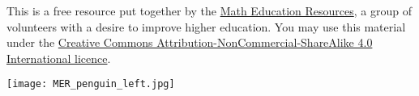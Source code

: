 \vfill

\begin{multicols}{2}
\hfill \begin{minipage}{0.45\textwidth}This is a free resource put together by the \href{http://www.math-education-resources.com}{Math Education Resources}, a group of volunteers with a desire to improve higher education. You may use this material under the \href{https://creativecommons.org/licenses/by-nc-sa/4.0/}{Creative Commons Attribution-NonCommercial-ShareAlike 4.0 International licence}.

\end{minipage}

\columnbreak

\begin{center}
\texttt{[image: MER\_penguin\_left.jpg]}
\end{center}

\vfill

\end{multicols}
